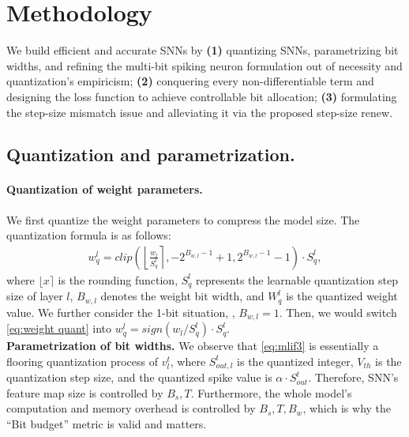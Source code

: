 \section{Methodology}
\label{sec:methodology}
We build efficient and accurate SNNs by \textbf{(1)} quantizing SNNs, parametrizing bit widths, and refining the multi-bit spiking neuron formulation out of necessity and  quantization's empiricism; \textbf{(2)} conquering every non-differentiable term and designing  the loss function to achieve controllable bit allocation; \textbf{(3)} formulating the step-size mismatch issue and  alleviating it via the proposed step-size renew.

\subsection{Quantization and parametrization.}
\label{sbsec:quant and param}
\paragraph{Quantization of weight parameters.} 
We first quantize the weight parameters to compress the model size. The quantization formula is as follows:
\begin{align}
w^l_q= clip(\left \lfloor \frac{w_l}{S^l_q} \right \rceil, -2^{B_{w,l}-1}+1, 2^{B_{w,l}-1}-1 )\cdot S^l_q,\label{eq:weight quant}
\end{align}
where  $\lfloor x\rceil$ is the rounding function,  $S_q^l$ represents the learnable quantization step size of layer $l$, $B_{w,l}$ denotes the weight bit width, and $W_q^l$ is the quantized weight value. We further  consider the 1-bit situation, \ie, $B_{w,l}=1$. Then, we would switch  \cref{eq:weight quant} into $w^l_q=sign(w_l/S^l_q)\cdot S^l_q$.
\\\textbf{Parametrization of bit widths.} 
We observe that  \cref{eq:mlif3} is essentially a flooring quantization process of $v^t_l$, where $S_{out,l}^t$ is the quantized integer, $V_{th}$ is the quantization step size, and the quantized spike value is $\alpha \cdot S_{out}^t$. Therefore, SNN's feature map size is controlled by $B_s,T$. Furthermore, the whole model's computation and memory overhead is controlled by $B_s,T,B_w$, which is why the “Bit budget” metric is valid and matters. 

